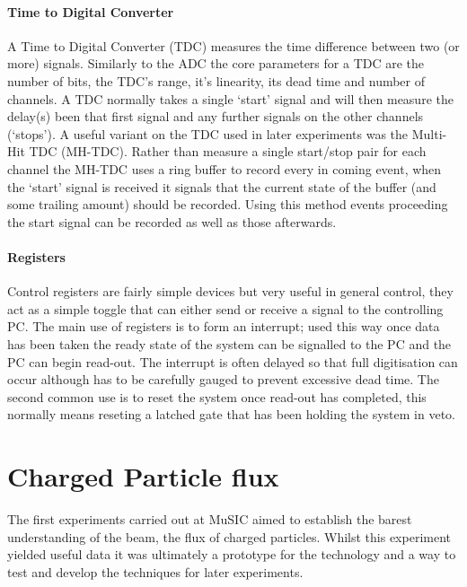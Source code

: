 \subsubsection{Time to Digital Converter} %
\label{ssub:time_to_digital_converter}
A Time to Digital Converter (TDC) measures the time difference between two (or more) signals. Similarly to the ADC the core parameters for a TDC are the number of bits, the TDC's range, it's linearity, its dead time and number of channels. A TDC normally takes a single `start' signal and will then measure the delay(s) been that first signal and any further signals on the other channels (`stops'). A useful variant on the TDC used in later experiments was the Multi-Hit TDC (MH-TDC). Rather than measure a single start/stop pair for each channel the MH-TDC uses a ring buffer to record every in coming event, when the `start' signal is received it signals that the current state of the buffer (and some trailing amount) should be recorded. Using this method events proceeding the start signal can be recorded as well as those afterwards.

\subsubsection{Registers} %
\label{ssub:registers}
Control registers are fairly simple devices but very useful in general control, they act as a simple toggle that can either send or receive a signal to the controlling PC. The main use of registers is to form an interrupt; used this way once data has been taken the ready state of the system can be signalled to the PC and the PC can begin read-out. The interrupt is often delayed so that full digitisation can occur although has to be carefully gauged to prevent excessive dead time. The second common use is to reset the system once read-out has completed, this normally means reseting a latched gate that has been holding the system in veto.

\chapter{Charged Particle flux} %
\label{cha:charged_particle_flux}
The first experiments carried out at MuSIC aimed to establish the barest understanding of the beam, the flux of charged particles. Whilst this experiment yielded useful data it was ultimately a prototype for the technology and a way to test and develop the techniques for later experiments.

